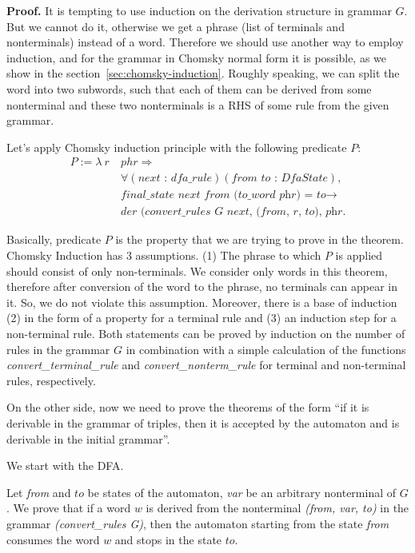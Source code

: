 \textbf{Proof.}
It is tempting to use induction on the derivation structure in grammar $G$. But we cannot do it, otherwise we get a phrase (list of terminals and nonterminals) instead of a word. Therefore we should use another way to employ induction, and for the grammar in Chomsky normal form it is possible, as we show in the section~\ref{sec:chomsky-induction}. Roughly speaking, we can split the word into two subwords, such that each of them can be derived from some nonterminal and these two nonterminals is a RHS of some rule from the given grammar.

Let's apply Chomsky induction principle with the following predicate $P$:
\begin{align*}
  P :=  \lambda \ r \ & phr \Rightarrow \\
        &\forall (\textit{next : dfa\_rule}) (\textit{from to : DfaState}), \\
        &\textit{final\_state next from (to\_word phr) = to} \to \\
        &\textit{der (convert\_rules G next, (from, r, to), phr}.
\end{align*}

Basically, predicate $P$ is the property that we are trying to prove in the theorem. Chomsky Induction has 3 assumptions.
(1) The phrase to which $P$ is applied should consist of only non-terminals. We consider only words in this theorem, therefore after conversion of the word to the phrase, no terminals can appear in it. So, we do not violate this assumption.
Moreover, there is a base of induction (2) in the form of a property for a terminal rule and (3) an induction step for a non-terminal rule.
Both statements can be proved by induction on the number of rules in the grammar $G$ in combination with a simple calculation of the functions \textit{convert\_terminal\_rule} and \textit{convert\_nonterm\_rule} for terminal and non-terminal rules, respectively.

On the other side, now we need to prove the theorems of the form  ``if it is derivable in the grammar of triples, then it is accepted by the automaton and is derivable in the initial grammar''.

We start with the DFA.

\begin{theorem}
	Let \textit{from} and $to$ be states of the automaton, \textit{var} be an arbitrary nonterminal of $G$. We prove that if a word $w$ is derived from the nonterminal \textit{(from, var, to)} in the grammar \textit{(convert\_rules G)}, then the automaton starting from the state \textit{from} consumes the word $w$ and stops in the state $to$.
\end{theorem}

